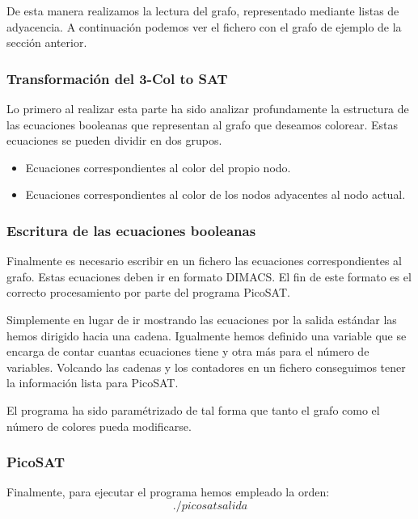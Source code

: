\documentclass{article}
\begin{document}
        De esta manera realizamos la lectura del grafo, representado mediante listas de adyacencia.
        A continuación podemos ver el fichero con el grafo de ejemplo de la sección anterior.
    
    \subsubsection{Transformación del 3-Col to SAT}
        Lo primero al realizar esta parte ha sido analizar profundamente la estructura de las ecuaciones booleanas que 
        representan al grafo que deseamos colorear.
        Estas ecuaciones se pueden dividir en dos grupos.
        \begin{itemize}
            \item Ecuaciones correspondientes al color del propio nodo.
            \item Ecuaciones correspondientes al color de los nodos adyacentes al nodo actual.
        \end{itemize}
    
    \subsubsection{Escritura de las ecuaciones booleanas}
        Finalmente es necesario escribir en un fichero las ecuaciones correspondientes al grafo. Estas 
        ecuaciones deben ir en formato DIMACS. El fin de este formato es el correcto procesamiento por parte del 
        programa PicoSAT. 

        Simplemente en lugar de ir mostrando las ecuaciones por la salida estándar las hemos dirigido hacia una cadena. Igualmente 
        hemos definido una variable que se encarga de contar cuantas ecuaciones tiene y otra más para el número de variables. 
        Volcando las cadenas y los contadores en un fichero conseguimos tener la información lista para PicoSAT.

        El programa ha sido paramétrizado de tal forma que tanto el grafo como el número de colores pueda modificarse. 
    
    \subsubsection{PicoSAT}
        Finalmente, para ejecutar el programa hemos empleado la orden: 
        \[./picosat salida\]
\end{document}
